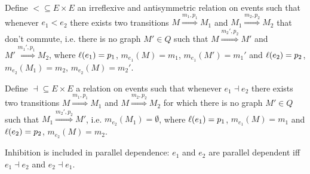 \begin{definition}
\label{def:seq_dep}
  Define $< \subseteq E\times E$ an irreflexive and antisymmetric relation on events such that whenever $e_1 < e_2$ there exists two transitions $M\overset{m_1,p_1}{\Rightarrow} M_1$ and $M_1\overset{m_2,p_2}{\Rightarrow} M_2$ that don't commute, i.e. there is no graph $M'\in Q$ such that $M\overset{m_2',p_2}{\Rightarrow} M'$ and $M'\overset{m_1',p_1}{\Rightarrow} M_2$, where $\ell(e_1)=p_1$, $m_{e_1}(M) = m_1$, $m_{e_1}(M') = m_1'$ and $\ell(e_2)=p_2$, $m_{e_2}(M_1) = m_2$, $m_{e_2}(M) = m_2'$.
\end{definition}

\begin{definition}[Inhibition]
\label{def:inhibition}
  Define $\dashv\subseteq E \times E$ a relation on events such that whenever $e_1\dashv e_2$ there exists two transitions $M\overset{m_1,p_1}{\Rightarrow} M_1$ and $M\overset{m_2,p_2}{\Rightarrow} M_2$ for which there is no graph $M'\in Q$ such that $M_1\overset{m_2',p_2}{\Rightarrow} M'$, i.e. $m_{e_2}(M_1) = \emptyset$, where $\ell(e_1)=p_1$, $m_{e_1}(M) = m_1$ and $\ell(e_2)=p_2$, $m_{e_2}(M) = m_2$.
\end{definition}

\begin{remark}
  Inhibition is included in parallel dependence: $e_1$ and $e_2$ are parallel dependent iff $e_1\dashv e_2$ and $e_2\dashv e_1$.
\end{remark}
